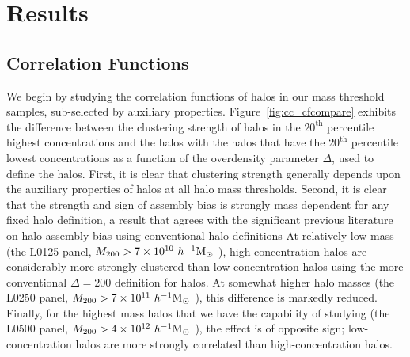 \documentclass[usenatbib]{mnras}
\begin{document}
\section[]{Results}
\label{section:results}


\subsection{Correlation Functions}
\label{sub:cfresults}

We begin by studying the correlation functions of halos in our mass threshold samples, sub-selected by auxiliary
properties. Figure~\ref{fig:cc_cfcompare} exhibits the difference between the clustering strength of halos in the
$20^{\mathrm{th}}$ percentile highest concentrations and the halos with the halos that have the
$20^{\mathrm{th}}$ percentile lowest concentrations as a function of the overdensity parameter $\Delta$, used to
define the halos.  
First, it is clear that clustering strength generally depends upon the auxiliary properties of
halos at all halo mass thresholds. 
Second, it is clear that the strength and sign of assembly bias is 
strongly mass dependent for any fixed halo definition, 
a result that agrees with the significant previous literature on halo assembly bias using conventional halo definitions 
\citep{wechsler_etal02, gao_etal05, zentner07, wechsler_etal06, harker_etal06, croton_etal07, dalal_etal08, mao_etal15, sunayama_etal16} 
At relatively low mass (the L0125 panel, 
$M_{200} > 7 \times 10^{10} \ h^{-1}\mathrm{M}_{\odot}~$), high-concentration halos are considerably 
more strongly clustered than low-concentration halos using the more 
conventional $\Delta = 200$ definition for halos. At somewhat higher halo masses 
(the L0250 panel, $M_{200} > 7\times 10^{11} \ h^{-1}\mathrm{M}_{\odot}~$), this difference is markedly reduced. 
Finally, for the highest mass halos that we have
the capability of studying (the L0500 panel, $M_{200} > 4 \times 10^{12} \ h^{-1}\mathrm{M}_{\odot}~$), 
the effect is of opposite sign; low-concentration halos are more strongly correlated 
than high-concentration halos.
\end{document}
